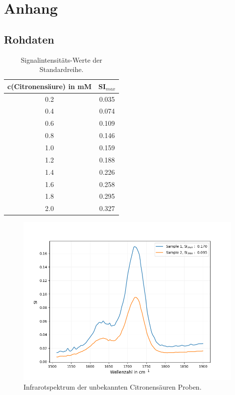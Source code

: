 \documentclass[10pt,a4paper]{article}
\begin{document}
		
	\section{Anhang}
		\subsection{Rohdaten}
		
			
			
			\begin{table}[H]
				\centering
				\caption{Signalintensitäts-Werte der Standardreihe.}
				\label{tab:r_square_standardcurve}
				\begin{tabular}{cc}
					\toprule
					c(Citronensäure) in mM & SI$_{max}$\\
					\midrule
					0.2	&0.035\\
					0.4	&0.074\\
					0.6	&0.109\\
					0.8	&0.146\\
					1.0	&0.159\\
					1.2	&0.188\\
					1.4	&0.226\\
					1.6	&0.258\\
					1.8	&0.295\\
					2.0	&0.327\\
					\bottomrule
				\end{tabular}
			\end{table}	
			
			\begin{figure}[H]
				\centering
				\includegraphics[scale=0.55]{unknown_sample.png}
				\caption{Infrarotspektrum der unbekannten Citronensäuren Proben.}
				\label{fig:IR_unknown}
			\end{figure}
				
\end{document}
